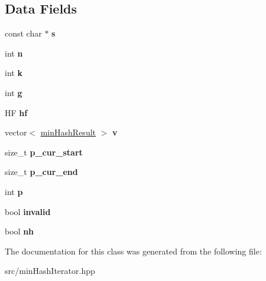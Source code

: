 \subsection*{Data Fields}
\begin{DoxyCompactItemize}
\item 
\mbox{\label{classpreAllocMinHashIterator_a4172453b46109b08804759b6bfbaa8a9}} 
const char $\ast$ {\bfseries s}
\item 
\mbox{\label{classpreAllocMinHashIterator_aabb92a16e79dcf3997c313e74d20d77c}} 
int {\bfseries n}
\item 
\mbox{\label{classpreAllocMinHashIterator_ad816b040e8c8199f622abcb1e3492d73}} 
int {\bfseries k}
\item 
\mbox{\label{classpreAllocMinHashIterator_a5bdad61df61e8919c76c606df753e3f8}} 
int {\bfseries g}
\item 
\mbox{\label{classpreAllocMinHashIterator_af0685c109ccb258481089926b0587e0b}} 
HF {\bfseries hf}
\item 
\mbox{\label{classpreAllocMinHashIterator_a12ddb5d628a2761fdd075460f52eae90}} 
vector$<$ \hyperlink{structminHashResult}{min\+Hash\+Result} $>$ {\bfseries v}
\item 
\mbox{\label{classpreAllocMinHashIterator_abd6a80481ca102307ddb724148854ebd}} 
size\+\_\+t {\bfseries p\+\_\+cur\+\_\+start}
\item 
\mbox{\label{classpreAllocMinHashIterator_a6e4d6dc5c621852bd27a61dcd5917188}} 
size\+\_\+t {\bfseries p\+\_\+cur\+\_\+end}
\item 
\mbox{\label{classpreAllocMinHashIterator_a4b76bb8a9e95eb305b682b4460e0fa04}} 
int {\bfseries p}
\item 
\mbox{\label{classpreAllocMinHashIterator_a1477a7f71b524ab5a17e5f0e9277f35f}} 
bool {\bfseries invalid}
\item 
\mbox{\label{classpreAllocMinHashIterator_a383961c9dbbc9209fe6216894ebae728}} 
bool {\bfseries nh}
\end{DoxyCompactItemize}


The documentation for this class was generated from the following file\+:\begin{DoxyCompactItemize}
\item 
src/min\+Hash\+Iterator.\+hpp\end{DoxyCompactItemize}
